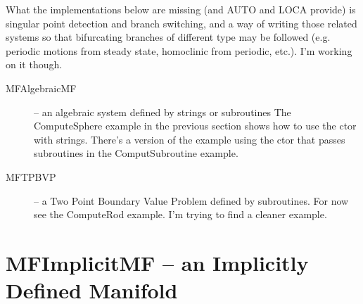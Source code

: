 \documentclass[12pt]{article}
\begin{document}
What the implementations below are missing (and AUTO and LOCA provide) is singular point detection and branch switching, and a way of writing those
related systems so that bifurcating branches of different type may be followed (e.g. periodic motions from steady state,
homoclinic from periodic, etc.). I'm working on it though.

\begin{description}
\item [MFAlgebraicMF] -- an algebraic system defined by strings or subroutines
The {ComputeSphere} example in the previous section shows how to use the ctor with strings. There's a
version of the example using the ctor that passes subroutines in the {ComputSubroutine} example.
\item [MFTPBVP] -- a Two Point Boundary Value Problem defined by subroutines. For now see the {ComputeRod} example. I'm trying to find a cleaner example.
\end{description}

\section{MFImplicitMF -- an Implicitly Defined Manifold}
\end{document}
